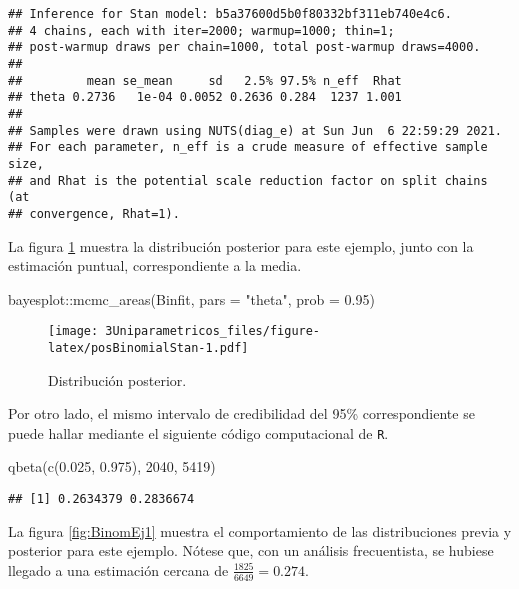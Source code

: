 \documentclass[
  10pt,
  spanish,
]{book}
\newenvironment{Shaded}{\begin{snugshade}}{\end{snugshade}}
\newcommand{\AttributeTok}[1]{\textcolor[rgb]{0.77,0.63,0.00}{#1}}
\newcommand{\DecValTok}[1]{\textcolor[rgb]{0.00,0.00,0.81}{#1}}
\newcommand{\FloatTok}[1]{\textcolor[rgb]{0.00,0.00,0.81}{#1}}
\newcommand{\FunctionTok}[1]{\textcolor[rgb]{0.00,0.00,0.00}{#1}}
\newcommand{\NormalTok}[1]{#1}
\newcommand{\SpecialCharTok}[1]{\textcolor[rgb]{0.00,0.00,0.00}{#1}}
\newcommand{\StringTok}[1]{\textcolor[rgb]{0.31,0.60,0.02}{#1}}
\theoremstyle{definition}
\theoremstyle{definition}
\theoremstyle{definition}
\theoremstyle{definition}
\theoremstyle{remark}
\begin{document}
\begin{verbatim}
## Inference for Stan model: b5a37600d5b0f80332bf311eb740e4c6.
## 4 chains, each with iter=2000; warmup=1000; thin=1; 
## post-warmup draws per chain=1000, total post-warmup draws=4000.
## 
##         mean se_mean     sd   2.5% 97.5% n_eff  Rhat
## theta 0.2736   1e-04 0.0052 0.2636 0.284  1237 1.001
## 
## Samples were drawn using NUTS(diag_e) at Sun Jun  6 22:59:29 2021.
## For each parameter, n_eff is a crude measure of effective sample size,
## and Rhat is the potential scale reduction factor on split chains (at 
## convergence, Rhat=1).
\end{verbatim}

La figura \ref{fig:posBinomialStan} muestra la distribución posterior para este ejemplo, junto con la estimación puntual, correspondiente a la media.

\begin{Shaded}
\begin{Highlighting}[]
\NormalTok{bayesplot}\SpecialCharTok{::}\FunctionTok{mcmc\_areas}\NormalTok{(Binfit, }\AttributeTok{pars =} \StringTok{"theta"}\NormalTok{, }
                      \AttributeTok{prob =} \FloatTok{0.95}\NormalTok{)}
\end{Highlighting}
\end{Shaded}

\begin{figure}
\centering
\texttt{[image: 3Uniparametricos\_files/figure-latex/posBinomialStan-1.pdf]}
\caption{\label{fig:posBinomialStan}Distribución posterior.}
\end{figure}

Por otro lado, el mismo intervalo de credibilidad del 95\% correspondiente se puede hallar mediante el siguiente código computacional de \texttt{R}.

\begin{Shaded}
\begin{Highlighting}[]
\FunctionTok{qbeta}\NormalTok{(}\FunctionTok{c}\NormalTok{(}\FloatTok{0.025}\NormalTok{, }\FloatTok{0.975}\NormalTok{), }\DecValTok{2040}\NormalTok{, }\DecValTok{5419}\NormalTok{)}
\end{Highlighting}
\end{Shaded}

\begin{verbatim}
## [1] 0.2634379 0.2836674
\end{verbatim}

La figura \ref{fig:BinomEj1} muestra el comportamiento de las distribuciones previa y posterior para este ejemplo. Nótese que, con un análisis frecuentista, se hubiese llegado a una estimación cercana de \(\frac{1825}{6649}=0.274\).
\end{document}
